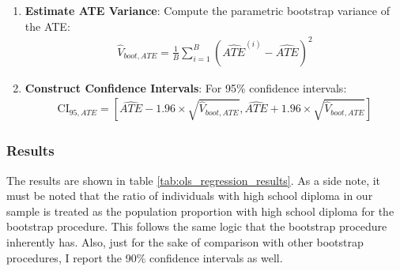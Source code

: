 \documentclass[11pt]{article}
\numberwithin{equation}{section}
\begin{document}
\begin{algorithm}
\begin{enumerate}
        \item \textbf{Estimate ATE Variance}: Compute the parametric bootstrap variance of the ATE:
        \begin{align}
            \hat{V}_{boot, ATE} = \frac{1}{B} \sum_{i=1}^B \left(\widehat{ATE}^{(i)} - \widehat{ATE}\right)^2
        \end{align}
        
        \item \textbf{Construct Confidence Intervals}: For 95\% confidence intervals:
        \begin{align}
            \text{CI}_{95, ATE} = \left[\widehat{ATE} - 1.96 \times \sqrt{\hat{V}_{boot, ATE}}, \widehat{ATE} + 1.96 \times \sqrt{\hat{V}_{boot, ATE}}\right]
        \end{align}
    \end{enumerate}
\end{algorithm}


    
    
    


\subsubsection{Results}

The results are shown in table \ref{tab:ols_regression_results}.
As a side note, it must be noted that the ratio of individuals with high school diploma in our sample 
is treated as the population proportion with high school diploma for the bootstrap procedure. This follows the same logic that the bootstrap procedure inherently has.
Also, just for the sake of comparison with other bootstrap procedures, I report the 90\% confidence intervals as well.
\end{document}
